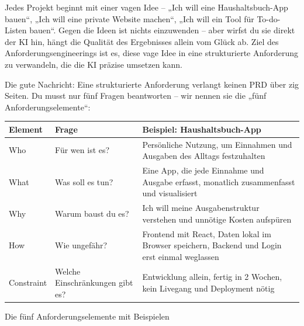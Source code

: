 


Jedes Projekt beginnt mit einer vagen Idee – „Ich will eine Haushaltsbuch-App bauen“, „Ich will eine private Website machen“, „Ich will ein Tool für To-do-Listen bauen“. Gegen die Ideen ist nichts einzuwenden – aber wirfst du sie direkt der KI hin, hängt die Qualität des Ergebnisses allein vom Glück ab. Ziel des Anforderungsengineerings ist es, diese vage Idee in eine strukturierte Anforderung zu verwandeln, die die KI präzise umsetzen kann.

Die gute Nachricht: Eine strukturierte Anforderung verlangt keinen PRD über zig Seiten. Du musst nur fünf Fragen beantworten – wir nennen sie die „fünf Anforderungselemente“:

\begin{center}
\begin{tabularx}{\linewidth}{|X|X|X|}
\hline
\textbf{Element} & \textbf{Frage} & \textbf{Beispiel: Haushaltsbuch-App} \tabularnewline
\hline
Who & Für wen ist es? & Persönliche Nutzung, um Einnahmen und Ausgaben des Alltags festzuhalten \tabularnewline
What & Was soll es tun? & Eine App, die jede Einnahme und Ausgabe erfasst, monatlich zusammenfasst und visualisiert \tabularnewline
Why & Warum baust du es? & Ich will meine Ausgabenstruktur verstehen und unnötige Kosten aufspüren \tabularnewline
How & Wie ungefähr? & Frontend mit React, Daten lokal im Browser speichern, Backend und Login erst einmal weglassen \tabularnewline
Constraint & Welche Einschränkungen gibt es? & Entwicklung allein, fertig in 2 Wochen, kein Livegang und Deployment nötig \tabularnewline
\hline
\end{tabularx}
\end{center}

\begin{center}\small\color{gray}Die fünf Anforderungselemente mit Beispielen\end{center}

